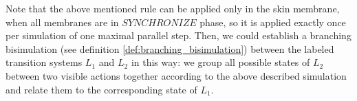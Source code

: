 Note that the above mentioned rule can be applied only in the skin membrane, when all membranes are in $\mathit{SYNCHRONIZE}$ phase, so it is applied exactly once per simulation of one maximal parallel step.
Then, we could establish a branching bisimulation (see definition \ref{def:branching_bisimulation}) between the labeled transition systems $L_1$ and $L_2$ in this way: we group all possible states of $L_2$ between two visible actions together according to the above described simulation and relate them to the corresponding state of $L_1$.
